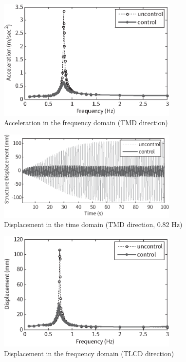 \begin{figure}[ht]
\centering
\includegraphics[width=0.8\textwidth] {figure/5-7.eps}
\caption{Acceleration in the frequency domain (TMD direction)}
\label{fig:5-7}
\end{figure}

\begin{figure}[ht]
\centering
\includegraphics[width=0.8\textwidth] {figure/5-8.eps}
\caption{Displacement in the time domain (TMD direction, 0.82 Hz)}
\label{fig:5-8}
\end{figure}

\begin{figure}[ht]
\centering
\includegraphics[width=0.8\textwidth] {figure/5-9.eps}
\caption{Displacement in the frequency domain (TLCD direction)}
\label{fig:5-9}
\end{figure}

